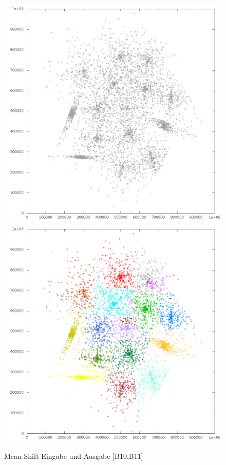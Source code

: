 \documentclass[10pt,utf8]{beamer}
\begin{document}
\begin{frame}
	\centering
	\begin{figure}[p!]
		\vspace{-10pt}
		\hspace{-25pt}
		\includegraphics[scale=0.23, keepaspectratio]{../output/pics/s4_black.png}
		\includegraphics[scale=0.23, keepaspectratio]{../output/pics/s4_colored.png}
		\caption{Mean Shift Eingabe und Ausgabe [B10,B11]}
	\end{figure}
\end{frame}
\end{document}

